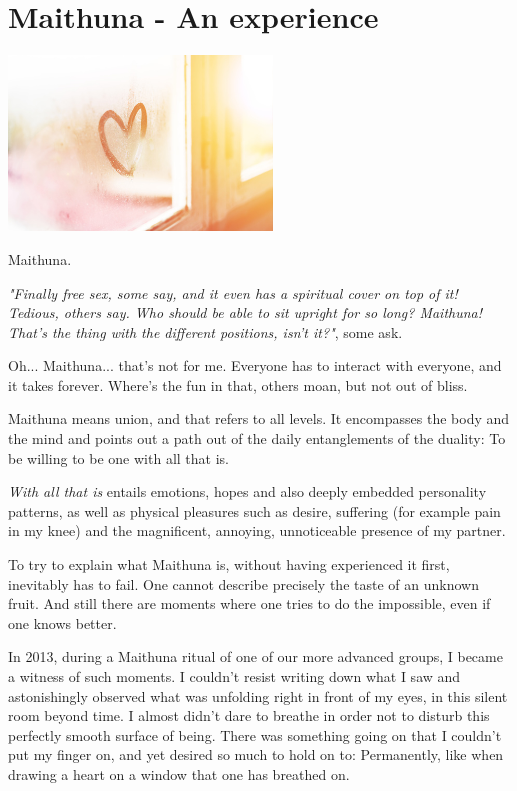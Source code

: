 \section{Maithuna - An experience}

\begin{center}
\includegraphics[width=7cm]{images/19_maithuna.png}
\end{center}

Maithuna.

\textit{"Finally free sex, some say, and it even has a spiritual cover on top of it! Tedious, others say. Who should be able to sit upright for so long? Maithuna! That's the thing with the different positions, isn't it?"}, some ask.

Oh... Maithuna... that's not for me. Everyone has to interact with everyone, and it takes forever. Where's the fun in that, others moan, but not out of bliss.

Maithuna means union, and that refers to all levels. It encompasses the body and the mind and points out a path out of the daily entanglements of the duality: To be willing to be one with all that is.

\textit{With all that is} entails emotions, hopes and also deeply embedded personality patterns, as well as physical pleasures such as desire, suffering (for example pain in my knee) and the magnificent, annoying, unnoticeable presence of my partner.

To try to explain what Maithuna is, without having experienced it first, inevitably has to fail. One cannot describe precisely the taste of an unknown fruit. And still there are moments where one tries to do the impossible, even if one knows better.

In 2013, during a Maithuna ritual of one of our more advanced groups, I became a witness of such moments. I couldn't resist writing down what I saw and astonishingly observed what was unfolding right in front of my eyes, in this silent room beyond time. I almost didn’t dare to breathe in order not to disturb this perfectly smooth surface of being. There was something going on that I couldn't put my finger on, and yet desired so much to hold on to: Permanently, like when drawing a heart on a window that one has breathed on.

